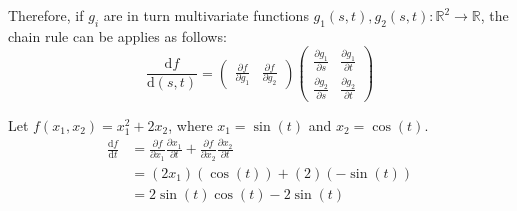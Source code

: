 \begin{description}
        Therefore, if $g_i$ are in turn multivariate functions $g_1(s, t), g_2(s, t): \mathbb{R}^2 \rightarrow \mathbb{R}$,
        the chain rule can be applies as follows:
        \[
            \frac{\text{d}f}{\text{d}(s, t)} = 
            \begin{pmatrix}
                \frac{\partial f}{\partial g_1} & \frac{\partial f}{\partial g_2}
            \end{pmatrix}
            \begin{pmatrix}
                \frac{\partial g_1}{\partial s} & \frac{\partial g_1}{\partial t} \\ 
                \frac{\partial g_2}{\partial s} & \frac{\partial g_2}{\partial t}
            \end{pmatrix}
        \]

        \begin{example}
            Let $f(x_1, x_2) = x_1^2 + 2x_2$, where $x_1 = \sin(t)$ and $x_2 = \cos(t)$.
            \[
                \begin{split}
                    \frac{\text{d}f}{\text{d}t} & = 
                        \frac{\partial f}{\partial x_1}\frac{\partial x_1}{\partial t} + \frac{\partial f}{\partial x_2}\frac{\partial x_2}{\partial t} \\
                        & = (2x_1)(\cos(t)) + (2)(-\sin(t)) \\
                        & = 2\sin(t)\cos(t) - 2\sin(t)
                \end{split}
            \]
        \end{example}


\end{description}
